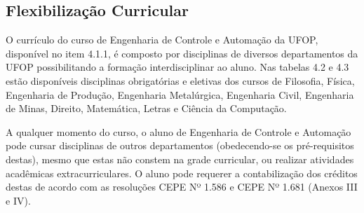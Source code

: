 \subsection*{Flexibilização Curricular}
O currículo do curso de Engenharia de Controle e Automação da UFOP, disponível no item 4.1.1, é composto por disciplinas de diversos departamentos da UFOP possibilitando a formação interdisciplinar ao aluno. Nas tabelas 4.2 e 4.3 estão disponíveis disciplinas obrigatórias e eletivas dos cursos de Filosofia, Física, Engenharia de Produção, Engenharia Metalúrgica, Engenharia Civil, Engenharia de Minas, Direito, Matemática, Letras e Ciência da Computação. 

A qualquer momento do curso, o aluno de Engenharia de Controle e Automação pode cursar disciplinas de outros departamentos (obedecendo-se os pré-requisitos destas), mesmo que estas não constem na grade curricular, ou realizar atividades acadêmicas extracurriculares. O aluno pode requerer a contabilização dos créditos destas de acordo com as resoluções CEPE  Nº  1.586 e CEPE  Nº  1.681 (Anexos III e IV).